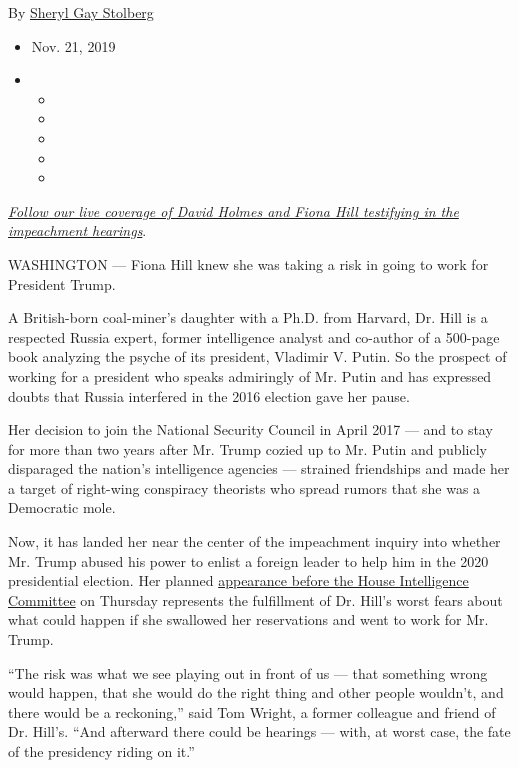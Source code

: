 By
\href{https://www.nytimes3xbfgragh.onion/by/sheryl-gay-stolberg}{Sheryl
Gay Stolberg}

\begin{itemize}
\item
  Nov. 21, 2019
\item
  \begin{itemize}
  \item
  \item
  \item
  \item
  \item
  \end{itemize}
\end{itemize}

\href{https://www.nytimes3xbfgragh.onion/2019/11/21/us/politics/impeachment-hearing.html}{\emph{Follow
our live coverage of David Holmes and Fiona Hill testifying in the
impeachment hearings}}.

WASHINGTON --- Fiona Hill knew she was taking a risk in going to work
for President Trump.

A British-born coal-miner's daughter with a Ph.D. from Harvard, Dr. Hill
is a respected Russia expert, former intelligence analyst and co-author
of a 500-page book analyzing the psyche of its president, Vladimir V.
Putin. So the prospect of working for a president who speaks admiringly
of Mr. Putin and has expressed doubts that Russia interfered in the 2016
election gave her pause.

Her decision to join the National Security Council in April 2017 --- and
to stay for more than two years after Mr. Trump cozied up to Mr. Putin
and publicly disparaged the nation's intelligence agencies --- strained
friendships and made her a target of right-wing conspiracy theorists who
spread rumors that she was a Democratic mole.

Now, it has landed her near the center of the impeachment inquiry into
whether Mr. Trump abused his power to enlist a foreign leader to help
him in the 2020 presidential election. Her planned
\href{https://www.nytimes3xbfgragh.onion/2019/11/21/us/politics/impeachment-hearing.html}{appearance
before the House Intelligence Committee} on Thursday represents the
fulfillment of Dr. Hill's worst fears about what could happen if she
swallowed her reservations and went to work for Mr. Trump.

``The risk was what we see playing out in front of us --- that something
wrong would happen, that she would do the right thing and other people
wouldn't, and there would be a reckoning,'' said Tom Wright, a former
colleague and friend of Dr. Hill's. ``And afterward there could be
hearings --- with, at worst case, the fate of the presidency riding on
it.''

